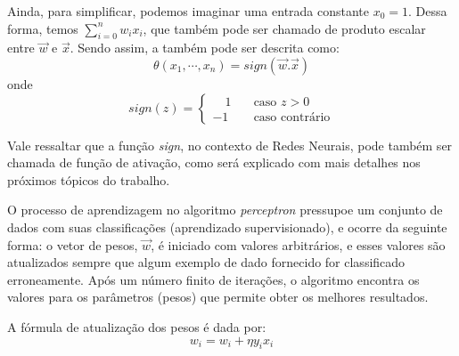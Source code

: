 Ainda, para simplificar, podemos imaginar uma entrada constante \(x_{0} = 1\). Dessa forma, temos \( \sum_{i=0}^n w_{i}x_{i} \), que também pode ser chamado de produto escalar entre \(\overrightarrow{w}\) e \(\overrightarrow{x}\). Sendo assim, a  também pode ser descrita como:
\begin{equation}
    \theta (x_{1}, \cdots, x_{n}) = sign(\overrightarrow{w}.\overrightarrow{x})
\label{eq:eq_perceptron_com_sign}
\end{equation}
onde
\begin{equation}
    sign (z) = 
    \begin{cases}
         \quad1       & \quad \text{caso } z > 0\\
        -1  & \quad \text{caso contrário}
    \end{cases}
\label{eq:eq_perceptron_sign}
\end{equation}

Vale ressaltar que a função \textit{sign}, no contexto de Redes Neurais, pode também ser chamada de função de ativação, como será explicado com mais detalhes nos próximos tópicos do trabalho.




O processo de aprendizagem no algoritmo \textit{perceptron} pressupoe um conjunto de dados com suas classificações (aprendizado supervisionado), e ocorre da seguinte forma: o vetor de pesos, \(\overrightarrow{w}\), é iniciado com valores arbitrários, e esses valores são atualizados sempre que algum exemplo de dado fornecido for classificado erroneamente. Após um número finito de iterações, o algoritmo encontra os valores para os parâmetros (pesos) que permite obter os melhores resultados. \cite{neural_network_learning_anthony_bartlett} \cite{tcc_anomalia_2020}

A fórmula de atualização dos pesos é dada por:
\begin{equation}
    w_{i} = w_{i} + \eta y_{i}x_{i}
    \label{eq:eq_perceptron_atualizacao_pesos}
\end{equation}

